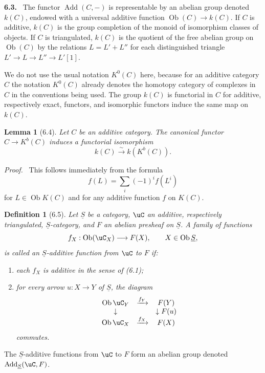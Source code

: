 \documentclass[11pt]{article}
\theoremstyle{plain}
\newtheorem*{lemma*}{Lemma}
\newtheorem*{definition*}{Definition}
\theoremstyle{definition}
\theoremstyle{remark}
\newenvironment{statement}[1]{\par\medskip\noindent\textbf{#1.}\ }{\par\medskip}
\newenvironment{prooftext}{\par\noindent\textit{Proof.}\ }{\par\medskip}
\DeclareMathOperator{\ob}{Ob}
\providecommand{\uS}{\underline{S}}
\providecommand{\iso}{\xrightarrow{\sim}}
\providecommand{\Add}{\operatorname{Add}}
\begin{document}
\begin{statement}{6.3}
The functor $\Add(C,-)$ is representable by an abelian group denoted $k(C)$, endowed with a universal additive function $\ob(C)\to k(C)$. If $C$ is additive, $k(C)$ is the group completion of the monoid of isomorphism classes of objects. If $C$ is triangulated, $k(C)$ is the quotient of the free abelian group on $\ob(C)$ by the relations $L=L'+L''$ for each distinguished triangle $L'\to L\to L''\to L'[1]$.

We do not use the usual notation $K^0(C)$ here, because for an additive category $C$ the notation $K^0(C)$ already denotes the homotopy category of complexes in $C$ in the conventions being used. The group $k(C)$ is functorial in $C$ for additive, respectively exact, functors, and isomorphic functors induce the same map on $k(C)$.
\end{statement}

\begin{lemma*}[6.4]
Let $C$ be an additive category. The canonical functor $C\to K^b(C)$ induces a functorial isomorphism
\[
k(C)\iso k(K^b(C)).
\]
\end{lemma*}

\begin{prooftext}
This follows immediately from the formula
\[
f(L)=\sum_i(-1)^i f(L^i)
\tag{6.4.1}
\]
for $L\in\ob K(C)$ and for any additive function $f$ on $K(C)$.
\end{prooftext}

\begin{definition*}[6.5]
Let $\uS$ be a category, $\uC$ an additive, respectively triangulated, $\uS$-category, and $F$ an abelian presheaf on $\uS$. A family of functions
\[
f_X:\ob(\uC_X)\longrightarrow F(X),\qquad X\in\ob\uS,
\]
is called an \emph{$\uS$-additive function} from $\uC$ to $F$ if:
\begin{enumerate}[label=(\roman*)]
\item each $f_X$ is additive in the sense of (6.1);
\item for every arrow $u:X\to Y$ of $\uS$, the diagram
\[
\begin{array}{ccc}
\ob\uC_Y&\xrightarrow{f_Y}&F(Y)\\
\downarrow&&\downarrow F(u)\\
\ob\uC_X&\xrightarrow{f_X}&F(X)
\end{array}
\]
commutes.
\end{enumerate}
\end{definition*}

The $\uS$-additive functions from $\uC$ to $F$ form an abelian group denoted $\Add_{\uS}(\uC,F)$.
\end{document}
